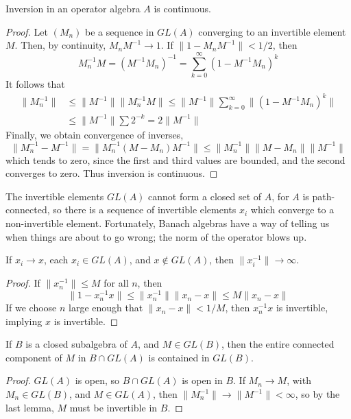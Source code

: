 \begin{lemma}
    Inversion in an operator algebra $A$ is continuous.
\end{lemma}
\begin{proof}
    Let $(M_n)$ be a sequence in $GL(A)$ converging to an invertible element $M$. Then, by continuity, $M_nM^{-1} \to 1$. If $\| 1 - M_n M^{-1} \| < 1/2$, then
    \[ M_n^{-1} M = (M^{-1}M_n)^{-1} = \sum_{k = 0}^\infty (1 - M^{-1}M_n)^k \]
    It follows that
    \begin{align*}
        \| M_n^{-1} \| &\leq \| M^{-1} \| \| M_n^{-1} M \| \leq \| M^{-1} \| \sum_{k = 0}^\infty \| (1 - M^{-1} M_n)^k \|\\
        &\leq \| M^{-1} \| \sum 2^{-k} = 2 \| M^{-1} \|
    \end{align*}
    Finally, we obtain convergence of inverses,
    \[ \| M_n^{-1} - M^{-1} \| = \| M_n^{-1} (M - M_n) M^{-1} \| \leq \| M_n^{-1} \| \| M - M_n \| \| M^{-1} \| \]
    which tends to zero, since the first and third values are bounded, and the second converges to zero. Thus inversion is continuous.
\end{proof}

The invertible elements $GL(A)$ cannot form a closed set of $A$, for $A$ is path-connected, so there is a sequence of invertible elements $x_i$ which converge to a non-invertible element. Fortunately, Banach algebras have a way of telling us when things are about to go wrong; the norm of the operator blows up.

\begin{lemma}
    If $x_i \to x$, each $x_i \in GL(A)$, and $x \not \in GL(A)$, then $\| x_i^{-1} \| \to \infty$.
\end{lemma}
\begin{proof}
    If $\| x_n^{-1} \| \leq M$ for all $n$, then
    \[ \| 1 - x_n^{-1} x \| \leq \| x_n^{-1} \| \| x_n - x \| \leq M \| x_n - x \| \]
    If we choose $n$ large enough that $\| x_n - x \| < 1/M$, then $x_n^{-1} x$ is invertible, implying $x$ is invertible.
\end{proof}

\begin{theorem}
    If $B$ is a closed subalgebra of $A$, and $M \in GL(B)$, then the entire connected component of $M$ in $B \cap GL(A)$ is contained in $GL(B)$.
\end{theorem}
\begin{proof}
    $GL(A)$ is open, so $B \cap GL(A)$ is open in $B$. If $M_n \to M$, with $M_n \in GL(B)$, and $M \in GL(A)$, then $\| M_n^{-1} \| \to \| M^{-1} \| < \infty$, so by the last lemma, $M$ must be invertible in $B$.
\end{proof}

